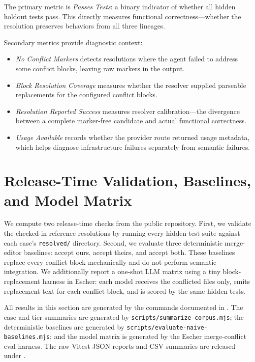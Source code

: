 \documentclass[11pt,letterpaper]{article}
\begin{document}
The primary metric is \emph{Passes Tests}: a binary indicator of whether all hidden holdout tests pass. This directly measures functional correctness---whether the resolution preserves behaviors from all three lineages.

Secondary metrics provide diagnostic context:

\begin{itemize}[leftmargin=2em]
\item \emph{No Conflict Markers} detects resolutions where the agent failed to address some conflict blocks, leaving raw markers in the output.
\item \emph{Block Resolution Coverage} measures whether the resolver supplied parseable replacements for the configured conflict blocks.
\item \emph{Resolution Reported Success} measures resolver calibration---the divergence between a complete marker-free candidate and actual functional correctness.
\item \emph{Usage Available} records whether the provider route returned usage metadata, which helps diagnose infrastructure failures separately from semantic failures.
\end{itemize}

\section{Release-Time Validation, Baselines, and Model Matrix}
\label{sec:results}

We compute two release-time checks from the public repository. First, we validate the checked-in reference resolutions by running every hidden test suite against each case's \texttt{resolved/} directory. Second, we evaluate three deterministic merge-editor baselines: accept ours, accept theirs, and accept both. These baselines replace every conflict block mechanically and do not perform semantic integration. We additionally report a one-shot LLM matrix using a tiny block-replacement harness in Escher: each model receives the conflicted files only, emits replacement text for each conflict block, and is scored by the same hidden tests.

All results in this section are generated by the commands documented in . The case and tier summaries are generated by \texttt{scripts/summarize-corpus.mjs}; the deterministic baselines are generated by \texttt{scripts/evaluate-naive-baselines.mjs}; and the model matrix is generated by the Escher merge-conflict eval harness. The raw Vitest JSON reports and CSV summaries are released under .
\end{document}
